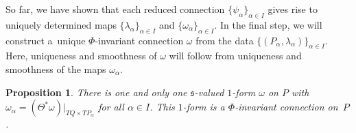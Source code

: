 \documentclass[11pt]{article}
\numberwithin{equation}{section}
\newtheorem{Proposition}[Theorem]{Proposition}
\begin{document}
So far, we have shown that each reduced connection $\{\psi_\alpha\}_{\alpha \in I}$ gives rise to uniquely
determined maps $\{\lambda_\alpha\}_{\alpha \in I}$ and $\{\omega_\alpha\}_{\alpha \in I}$.
In the f\/inal step, we will construct a~unique $\Phi$-invariant connection $\omega$ from the data
$\{(P_\alpha,\lambda_\alpha)\}_{\alpha\in I}$.
Here, uniqueness and smoothness of $\omega$ will follow from uniqueness and smoothness of the maps $\omega_\alpha$.

\begin{Proposition}\label{prop:reconstr}
There is one and only one $\mathfrak{s}$-valued $1$-form $\omega$ on $P$ with
$\omega_\alpha=(\Theta^{*}\omega)|_{TQ\times TP_\alpha}$ for all $\alpha \in I$. This $1$-form is a $\Phi$-invariant connection on~$P$.
\end{Proposition}
\end{document}
